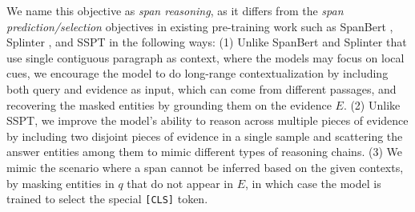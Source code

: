 \documentclass[11pt]{article}
\newcommand{\hs}[1]{\textcolor{blue}{Huan: #1}}
\newcommand{\nop}[1]{}
\begin{document}
We name this objective as  \textit{span reasoning}, as it differs from the \textit{span prediction/selection} objectives in existing pre-training work such as SpanBert \cite{joshi-etal-2020-spanbert}, Splinter \cite{ram2021fewshot}, and SSPT \cite{glass-etal-2020-span} in the following ways:\nop{(1) Instead of predicting individual tokens as in the masked language modeling objective, we directly pre-train span selection, which is consistent with the downstream QA model. \hs{should we also compare with other span prediction objectives like the one in SpanBert to better stress what we mean by `grounded' span selection? in other words, what is `ungrounded' like?}} 
(1) Unlike SpanBert and Splinter that use single contiguous paragraph as context, where the models may focus on local cues, we encourage the model to do long-range contextualization by including both query and evidence as input, which can come from different passages, and recovering the masked entities {by grounding them} on the evidence $E$. (2) Unlike SSPT, we improve the model's ability to reason across multiple pieces of evidence by including two disjoint pieces of evidence in a single sample and scattering the answer entities among them to mimic different types of reasoning chains. (3) \nop{Unlike all existing work, w}We mimic the scenario where a span cannot be inferred based on the given contexts, by masking entities in $q$ that do not appear in $E$, in which case the model is trained to select the special \texttt{[CLS]} token.

\nop{At inference time, \hs{may need to move this to exp section, because in exp, we talk about the extractive QA task..} we concatenate $q,E$ and add special tokens to form the input sequence as $[\texttt{[CLS]},q,\texttt{[QUESTION]},\texttt{[SEP]},E]$, and then score all the start, end locations and rank all spans $(s,e)$ by $g(s,e|q,E)$:}
\nop{should we move this paragraph to Section 5.1? so far the description is general and not involving extractive QA.}
\end{document}

